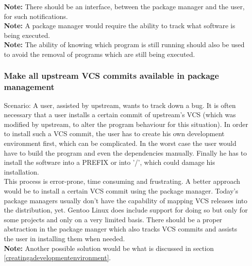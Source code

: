 \documentclass[a4paper,10pt]{article}
\begin{document}
\textbf{Note:} There should be an interface, between the package manager and the user, for such notifications.\\

\textbf{Note:} A package manager would require the ability to track what software is being executed. \\

\textbf{Note:} The ability of knowing which program is still running should also be used to avoid the removal of programs which are still being executed.





\subsubsection{Make all upstream VCS commits available in package management}
Scenario: A user, assisted by upstream, wants to track down a bug. It is often necessary that a user installs a certain commit of upstream's VCS (which was modified by upstream, to alter the program behaviour for this situation). In order to install such a VCS commit, the user has to create his own development environment first, which can be complicated. In the worst case the user would have to build the program and even the dependencies manually. Finally he has to install the software into a PREFIX or into '/', which could damage his installation.\\

This process is error-prone, time consuming and frustrating. A better approach would be to install a certain VCS commit using the package manager. Today's package managers usually don't have the capability of mapping VCS releases into the distribution, yet. Gentoo Linux does include support for doing so but only for some projects and only on a very limited basis. There should be a proper abstraction in the package manger which also tracks VCS commits and assists the user in installing them when needed.\\

\textbf{Note:} Another possible solution would be what is discussed in section \ref{creatingadevelopmentenvironment}.
\end{document}
